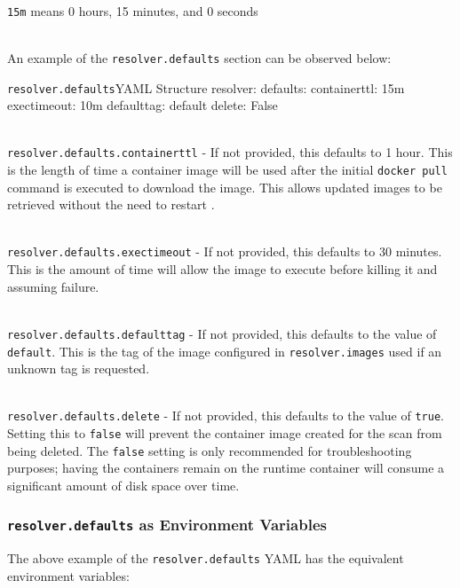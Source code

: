 \noindent\\\texttt{15m} means 0 hours, 15 minutes, and 0 seconds

\noindent\\An example of the \texttt{resolver.defaults} section can be observed below:\\

\begin{code}{\texttt{resolver.defaults}}{YAML Structure}{}
resolver:
    defaults:
        containerttl: 15m
        exectimeout: 10m
        defaulttag: default
        delete: False
\end{code}


\noindent\\\texttt{resolver.defaults.containerttl} - If not provided, this defaults to 1 hour.  
This is the length
of time a container image will be used after the initial 
\texttt{docker pull} command is executed to download the image.  This allows updated images to be 
retrieved without the need to restart \cxflowplusplus.

\noindent\\\texttt{resolver.defaults.exectimeout} - If not provided, this defaults to 30 minutes.  
This is the amount of time \cxflowplusplus will allow the \scaresolver image to execute before 
killing it and assuming failure.

\noindent\\\texttt{resolver.defaults.defaulttag} - If not provided, this defaults to the value 
of \texttt{default}.  This is the tag of the image configured in \texttt{resolver.images} used if 
an unknown tag is requested.

\noindent\\\texttt{resolver.defaults.delete} - If not provided, this defaults to the value 
of \texttt{true}.  Setting this to \texttt{false} will prevent the container image created
for the scan from being deleted.  The \texttt{false} setting is only recommended for
troubleshooting purposes;
having the \scaresolver containers remain on the \cxflowplusplus runtime container will consume a
significant amount of disk space over time.

\subsubsection{\texttt{resolver.defaults} as Environment Variables}

The above example of the \texttt{resolver.defaults} YAML has the equivalent environment variables:

